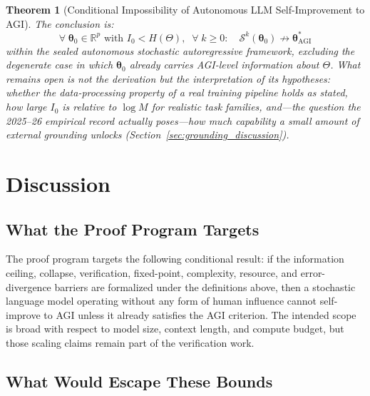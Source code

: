 \documentclass[11pt,a4paper]{article}
\newtheorem{theorem}{Theorem}[section]
\begin{document}
\begin{theorem}[Conditional Impossibility of Autonomous LLM Self-Improvement to AGI]
\noindent The conclusion is:
\begin{equation}
\boxed{\forall\; \bm{\theta}_0 \in \mathbb{R}^p \text{ with } I_0 < H(\Theta),\;\; \forall\; k \geq 0: \quad \mathcal{S}^k(\bm{\theta}_0) \not\to \bm{\theta}^*_{\mathrm{AGI}}}
\end{equation}
within the sealed autonomous stochastic autoregressive framework, excluding the degenerate case in which $\bm{\theta}_0$ already carries AGI-level information about $\Theta$. What remains open is not the derivation but the \emph{interpretation of its hypotheses}: whether the data-processing property of a real training pipeline holds as stated, how large $I_0$ is relative to $\log M$ for realistic task families, and---the question the 2025--26 empirical record actually poses---how much capability a small amount of external grounding unlocks (Section~\ref{sec:grounding_discussion}).
\end{theorem}

\section{Discussion}

\subsection{What the Proof Program Targets}

The proof program targets the following conditional result: if the information ceiling, collapse, verification, fixed-point, complexity, resource, and error-divergence barriers are formalized under the definitions above, then a stochastic language model operating without any form of human influence cannot self-improve to AGI unless it already satisfies the AGI criterion. The intended scope is broad with respect to model size, context length, and compute budget, but those scaling claims remain part of the verification work.

\subsection{What Would Escape These Bounds}
\end{document}

